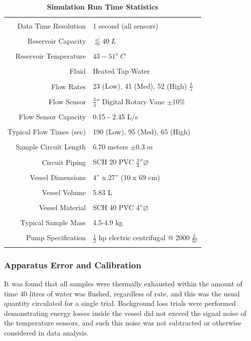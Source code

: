 \begin{table}[ht!]
\caption[Simulation Run-Time Statistics]{\textbf{Simulation Run Time Statistics}\label{runTime}}
\centering
\begin{tabular}{r l}
\hline
\hline
\\[-.5ex]
Data Time Resolution    & 1 second (all sensors)\\
\\
Reservoir Capacity	& $\lessapprox 40\;L$\\
\\
Reservoir Temperature 	& $43-51^{o}\;C$\\
\\
Fluid 			& Heated Tap Water\\
\\
Flow Rates		& 23 (Low), 41 (Med), 52 (High) $\frac{L}{s}$\\
\\
Flow Sensor		& $\frac{3}{4}''$ Digital Rotary Vane $\pm10\%$\\
\\
Flow Sensor Capacity	& 0.15 - 2.45 L/s\\
\\
Typical Flow Times (sec)& 190 (Low), 95 (Med), 65 (High)\\
\\
Sample Circuit Length	& 6.70 meters $\pm0.3\;m$\\
\\
Circuit Piping		& SCH 20 PVC $\frac{3}{4}''\varnothing$\\
\\
Vessel Dimensions	& 4'' x 27'' (10 x 69 cm)\\
\\
Vessel Volume		& 5.83 L\\
\\
Vessel Material		& SCH 40 PVC 4''$\varnothing$\\
\\
Typical Sample Mass	& 4.5-4.9 kg\\
\\
Pump Specification	& $\frac{1}{2}$ hp electric centrifugal @ $2000\;\frac{L}{hr}$\\
\\
\hline
\end{tabular}
\end{table} 

\subsubsection*{Apparatus Error and Calibration}
It was found that all samples were thermally exhausted within the amount of time 40 litres of water was flushed, regardless of rate, and this was the usual quantity circulated for a single trial. Background loss trials were performed demonstrating energy losses inside the vessel did not exceed the signal noise of the temperature sensors, and such this noise was not subtracted or otherwise considered in data analysis.

